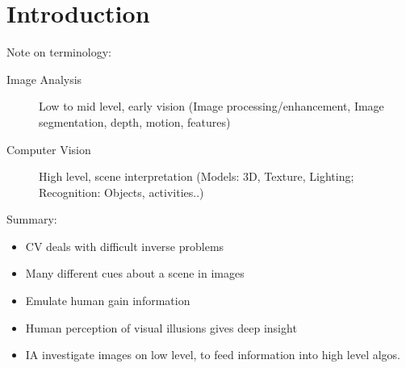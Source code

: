 \chapter*{Introduction}

Note on terminology:

\begin{description}
    \item[Image Analysis] Low to mid level, early vision (Image processing/enhancement, Image segmentation, depth, motion, features)
    \item[Computer Vision] High level, scene interpretation (Models: 3D, Texture, Lighting; Recognition: Objects, activities..)
\end{description}

Summary:

\begin{itemize}
    \item CV deals with difficult inverse problems
    \item Many different cues about a scene in images
    \item Emulate human gain information
    \item Human perception of visual illusions gives deep insight
    \item IA investigate images on low level, to feed information into high level algos.
\end{itemize}